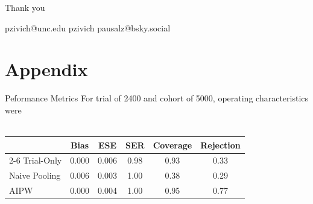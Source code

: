 \documentclass{beamer}
\begin{document}
\begin{frame}{Thank you}
	\begin{center}
		\small
		\faEnvelope \quad pzivich@unc.edu \qquad \quad 
		\faGithub \quad pzivich \qquad \quad
		\faHashtag \quad pausalz@bsky.social
	\end{center}
\end{frame}

\section{Appendix}

\begin{frame}{Peformance Metrics}
	For trial of 2400 and cohort of 5000, operating characteristics were 
	\\~\\
	\begin{tabular}{lccccc}
		\hline
		& Bias  & ESE   & SER  & Coverage & Rejection \\ \cline{2-6} 
		Trial-Only    & 0.000 & 0.006 & 0.98 & 0.93     & 0.33      \\
		Naive Pooling & 0.006 & 0.003 & 1.00 & 0.38     & 0.29      \\
		AIPW          & 0.000 & 0.004 & 1.00 & 0.95     & 0.77      \\ \hline
	\end{tabular}
\end{frame}
\end{document}
